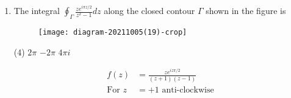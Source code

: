 \begin{enumerate}[label=\color{ocre}\textbf{\arabic*.}]
	{}
	\begin{tasks}(4)
		\task[\textbf{A.}] $b=0$
		\task[\textbf{B.}] $b=\pm a$
		\task[\textbf{C.}] $b=\pm 2 \pi a$
		\task[\textbf{D.}]  $b=a \pm 2 \pi$
	\end{tasks}
	\begin{answer}
		\begin{align*}
		\intertext{The function $f(z)$ will be analytic everywhere in the complex plane if and only if it satisfies the Cauchy Riemann equation in that region.}
		\Rightarrow \frac{\partial u}{\partial x}&=\frac{\partial v}{\partial y}\text{ and } \frac{\partial u}{\partial y}=-\frac{\partial v}{\partial x}\\
		\text{Hence }a e^{a x} \cos (b y)&=\frac{\partial v}{\partial y}\hspace{2cm}\text{(i)}\\
		\text{and }b e^{a x} \sin (b y)&=\frac{\partial v}{\partial x}\hspace{2cm}\text{(ii)}
		\intertext{From equation (i)}
		v(x, y)&=\frac{a e^{a x} \sin (b y)}{b}+c(y)\hspace{2cm}\text{(iii)}
		\intertext{Differentiating partially with $x$ gives}
		\frac{\partial v}{\partial x}&=\frac{a^{2} e^{a x} \sin (b y)}{b}\hspace{2cm}\text{(iv)}
		\intertext{From equation (iii) and (iv)}
		b e^{a x} \sin (b y)&=\frac{a^{2} e^{a x} \sin (b y)}{b}\\
		\Rightarrow b^{2}&=a^{2} \Rightarrow b=\pm a
		\end{align*}
		So the correct answer is \textbf{Option (B)}
	\end{answer}
	\item  The integral $\oint_{\Gamma} \frac{z e^{i \pi z / 2}}{z^{2}-1} d z$ along the closed contour $\Gamma$ shown in the figure is
	{}
	\begin{figure}[H]
		\centering
		\texttt{[image: diagram-20211005(19)-crop]}
	\end{figure}
	\begin{tasks}(4)
		\task[\textbf{B.}] $2 \pi$
		\task[\textbf{C.}] $-2 \pi$
		\task[\textbf{D.}] $4 \pi i$
	\end{tasks}
	\begin{answer}
		\begin{align*}
		f(z)&=\frac{z e^{i z \pi / 2}}{(z+1)(z-1)}\\
		\text{For }z&=+1\text{ anti-clockwise}\\

\end{align*}
\end{answer}
\end{enumerate}
